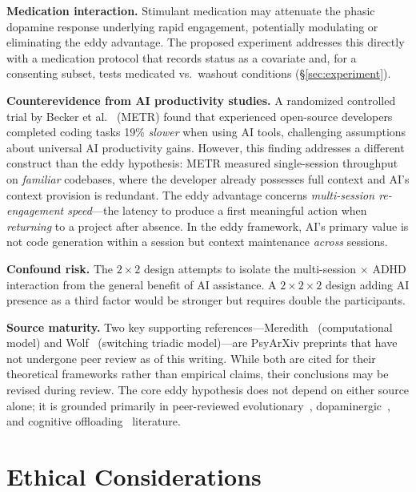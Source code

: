 \documentclass[sigconf,nonacm]{acmart}
\begin{document}
\textbf{Medication interaction.} Stimulant medication may attenuate the phasic dopamine response underlying rapid engagement, potentially modulating or eliminating the eddy advantage. The proposed experiment addresses this directly with a medication protocol that records status as a covariate and, for a consenting subset, tests medicated vs.\ washout conditions (\S\ref{sec:experiment}).

\textbf{Counterevidence from AI productivity studies.} A randomized controlled trial by Becker et al.~\cite{metr2025} (METR) found that experienced open-source developers completed coding tasks 19\% \emph{slower} when using AI tools, challenging assumptions about universal AI productivity gains. However, this finding addresses a different construct than the eddy hypothesis: METR measured single-session throughput on \emph{familiar} codebases, where the developer already possesses full context and AI's context provision is redundant. The eddy advantage concerns \emph{multi-session re-engagement speed}---the latency to produce a first meaningful action when \emph{returning} to a project after absence. In the eddy framework, AI's primary value is not code generation within a session but context maintenance \emph{across} sessions.

\textbf{Confound risk.} The $2 \times 2$ design attempts to isolate the multi-session $\times$ ADHD interaction from the general benefit of AI assistance. A $2 \times 2 \times 2$ design adding AI presence as a third factor would be stronger but requires double the participants.

\textbf{Source maturity.} Two key supporting references---Meredith~\cite{meredith2025} (computational model) and Wolf~\cite{wolf2025} (switching triadic model)---are PsyArXiv preprints that have not undergone peer review as of this writing. While both are cited for their theoretical frameworks rather than empirical claims, their conclusions may be revised during review. The core eddy hypothesis does not depend on either source alone; it is grounded primarily in peer-reviewed evolutionary~\cite{eisenberg2008, barack2024}, dopaminergic~\cite{grace2001, badgaiyan2015}, and cognitive offloading~\cite{risko2016} literature.

\section{Ethical Considerations}
\label{sec:ethics}
\end{document}
